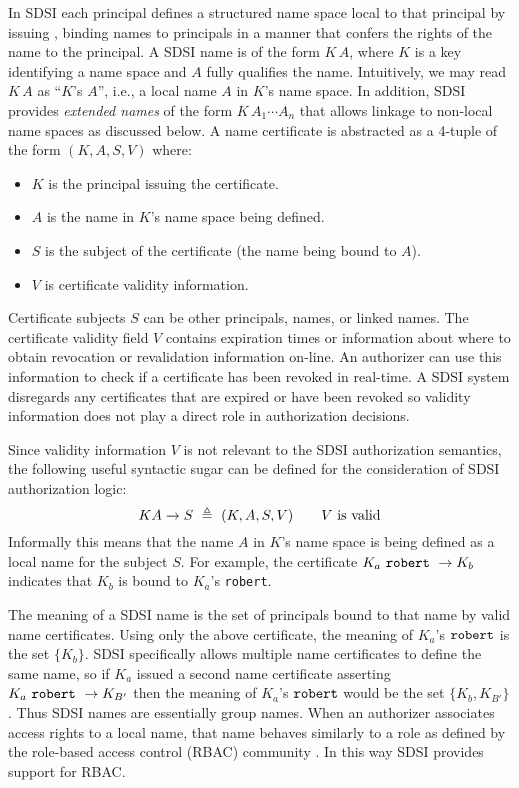 In SDSI each principal defines a structured name space local to that
principal by issuing , binding names to
principals in a manner that confers the rights of the name to the
principal. A SDSI name is of the form $K\,A$, where $K$ is a key
identifying a name space and $A$ fully qualifies the name. Intuitively, we
may read $K\,A$ as ``$K$'s $A$'', i.e., a local name $A$ in $K$'s name
space. In addition, SDSI provides \emph{extended names} of the form
$K\,A_1\cdots A_n$ that allows linkage to non-local name spaces as discussed
below. A name certificate is abstracted as a 4-tuple of the form $(K, A, S,
V)$ \cite{RFC-2693} where:
\begin{itemize}
\item $K$ is the principal issuing the certificate.
\item $A$ is the name in $K$'s name space being defined.
\item $S$ is the subject of the certificate (the name being bound to $A$).
\item $V$ is certificate validity information.
\end{itemize}
Certificate subjects $S$ can be other principals, names, or linked
names.  The certificate validity field $V$ contains expiration times
or information about where to obtain revocation or revalidation
information on-line. An authorizer can use this information to check
if a certificate has been revoked in real-time. A SDSI system
disregards any certificates that are expired or have been revoked so validity
information does not play a direct role in authorization decisions.

Since validity information $V$ is not relevant to the SDSI
authorization semantics, the following useful syntactic sugar can be
defined for the consideration of SDSI authorization logic:
$$
K A \rightarrow S\ \defeq\ (K,A,S,V) \qquad \text{$V$ is valid}
$$
Informally this means that the name $A$ in $K$'s name space is being
defined as a local name for the subject $S$. For example, the
certificate $K_a\,\,\text{\tt robert}\,\,\rightarrow K_b$ indicates
that $K_b$ is bound to $K_a$'s \texttt{robert}.

The meaning of a SDSI name is the set of principals bound to that name
by valid name certificates.  Using only the above certificate, the
meaning of $K_a$'s $\text{\tt robert}$ is the set $\{K_b\}$.  SDSI
specifically allows multiple name certificates to define the same
name, so if $K_a$ issued a second name certificate asserting
$K_a\,\,\text{\tt robert}\,\,\rightarrow K_{B'}$ then the meaning of
$K_a$'s $\text{\tt robert}$ would be the set $\{K_b, K_{B'}\}$.  Thus
SDSI names are essentially group names.  When an authorizer associates
access rights to a local name, that name behaves similarly to a role
as defined by the role-based access control (RBAC) community
\cite{Ferraiolo:RBAC}. In this way SDSI provides support for RBAC.

